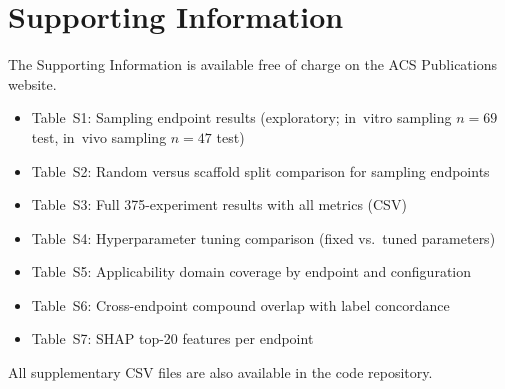 
\section*{Supporting Information}

The Supporting Information is available free of charge on the ACS Publications website.

\begin{itemize}
    \item Table~S1: Sampling endpoint results (exploratory; in~vitro sampling $n=69$ test, in~vivo sampling $n=47$ test)
    \item Table~S2: Random versus scaffold split comparison for sampling endpoints
    \item Table~S3: Full 375-experiment results with all metrics (CSV)
    \item Table~S4: Hyperparameter tuning comparison (fixed vs.\ tuned parameters)
    \item Table~S5: Applicability domain coverage by endpoint and configuration
    \item Table~S6: Cross-endpoint compound overlap with label concordance
    \item Table~S7: SHAP top-20 features per endpoint
\end{itemize}

All supplementary CSV files are also available in the code repository.
